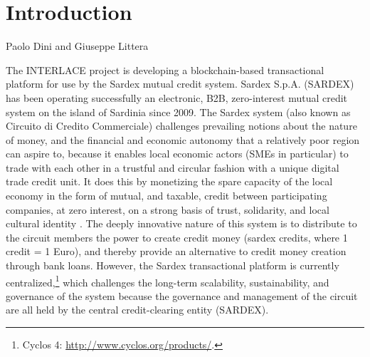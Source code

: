 \chapter{Introduction}
\label{ch:Introduction}

\vspace{-1cm}
\begin{center}
Paolo Dini and Giuseppe Littera
\end{center}


The INTERLACE project is developing a blockchain-based transactional platform for use by the Sardex mutual credit system. Sardex S.p.A. (SARDEX) has been operating successfully an electronic, B2B, zero-interest mutual credit system on the island of Sardinia since 2009. The Sardex system (also known as Circuito di Credito Commerciale) challenges prevailing notions about the nature of money, and the financial and economic autonomy that a relatively poor region can aspire to, because it enables local economic actors (SMEs in particular) to trade with each other in a trustful and circular fashion with a unique digital trade credit unit. It does this by monetizing the spare capacity of the local economy in the form of mutual, and taxable, credit between participating companies, at zero interest, on a strong basis of trust, solidarity, and local cultural identity \cite{LitteraEtAl2017,DiniMottaSartori2016,SartoriDini2016}. The deeply innovative nature of this system is to distribute to the circuit members the power to create credit money (sardex credits, where 1 credit = 1 Euro), and thereby provide an alternative to credit money creation through bank loans. However, the Sardex transactional platform is currently centralized,\footnote{Cyclos 4: \url{http://www.cyclos.org/products/}.} which challenges the long-term scalability, sustainability, and governance of the system because the governance and management of the circuit are all held by the central credit-clearing entity (SARDEX).


